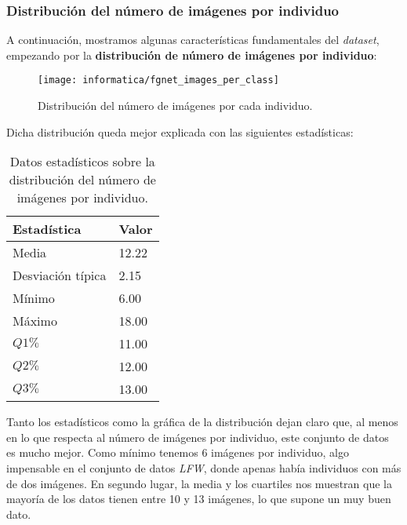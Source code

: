 \subsubsection{Distribución del número de imágenes por individuo}

A continuación, mostramos algunas características fundamentales del \textit{dataset}, empezando por la \textbf{distribución de número de imágenes por individuo}:

\begin{figure}[!hbtp]
    \centering
    \texttt{[image: informatica/fgnet\_images\_per\_class]}
    \caption{Distribución del número de imágenes por cada individuo.}
    \label{img:fgnet_images_per_class}
\end{figure}

Dicha distribución queda mejor explicada con las siguientes estadísticas:

\begin{table}[!hbtp]
\centering
\begin{tabular}{|l|l|}
    \hline
    \textbf{Estadística} & \textbf{Valor} \\
    \hline

    Media             & 12.22 \\
    Desviación típica & 2.15  \\
    Mínimo            & 6.00 \\
    Máximo            & 18.00 \\
    $Q1 \%$           & 11.00 \\
    $Q2 \%$           & 12.00 \\
    $Q3 \%$           & 13.00 \\

    \hline

\end{tabular}
\caption{Datos estadísticos sobre la distribución del número de imágenes por individuo.}
\label{table:fgnet_images_per_class}
\end{table}

Tanto los estadísticos como la gráfica de la distribución dejan claro que, al menos en lo que respecta al número de imágenes por individuo, este conjunto de datos es mucho mejor. Como mínimo tenemos 6 imágenes por individuo, algo impensable en el conjunto de datos \textit{LFW}, donde apenas había individuos con más de dos imágenes. En segundo lugar, la media y los cuartiles nos muestran que la mayoría de los datos tienen entre 10 y 13 imágenes, lo que supone un muy buen dato.

